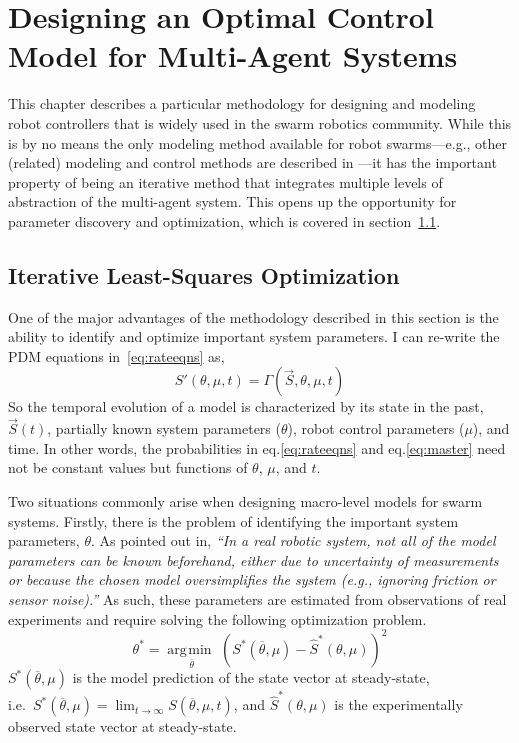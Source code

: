 \documentclass[defaultstyle,12pt]{proposal}
\DeclareMathOperator*{\argmin}{\arg\!\min\>}
\begin{document}
\chapter{Designing an Optimal Control Model for Multi-Agent Systems}
This chapter describes a particular methodology for designing and modeling robot controllers that is widely used in the swarm robotics community. While this is by no means the only modeling method available for robot swarms---e.g., other (related) modeling and control methods are described in \cite{Bayazit2005,Berman2007,Billard1999,Sugawara2013}---it has the important property of being an iterative method that integrates multiple levels of abstraction of the multi-agent system. This opens up the opportunity for parameter discovery and optimization, which is covered in section~\ref{sec:opt}.

\section{Iterative Least-Squares Optimization}\label{sec:opt}
One of the major advantages of the methodology described in this section is the ability to identify and optimize important system parameters. I can re-write the PDM equations in~\eqref{eq:rateeqns} as,
\begin{equation}
S'(\theta,\mu,t) = \Gamma\left(\vec{S}, \theta, \mu, t\right)
\end{equation}
So the temporal evolution of a model is characterized by its state in the past, $\vec{S}(t)$, partially known system parameters ($\theta$), robot control parameters ($\mu$), and time. In other words, the probabilities in eq.\eqref{eq:rateeqns} and eq.\eqref{eq:master} need not be constant values but functions of $\theta$, $\mu$, and $t$.

Two situations commonly arise when designing macro-level models for swarm systems. Firstly, there is the problem of identifying the important system parameters, $\theta$. As pointed out in\cite{Correll2008}, \emph{``In a real robotic system, not all of the model parameters can be known beforehand, either due to uncertainty of measurements or because the chosen model oversimplifies the system (e.g., ignoring friction or sensor noise).''} As such, these parameters are estimated from observations of real experiments and require solving the following optimization problem.
\begin{equation}
	\theta^* = \underset{\overline{\theta}}{\argmin}\left(S^*(\overline{\theta},\mu) - \hat{S}^*(\theta, \mu)\right)^2 \label{eq:thetaopt}
\end{equation}
$S^*(\overline{\theta},\mu)$ is the model prediction of the state vector at steady-state,\\ i.e.~$S^*(\overline{\theta},\mu) = \lim_{t \to \infty}S(\overline{\theta},\mu, t)$, and $\hat{S}^*(\theta, \mu)$ is the experimentally observed state vector at steady-state.
\end{document}
